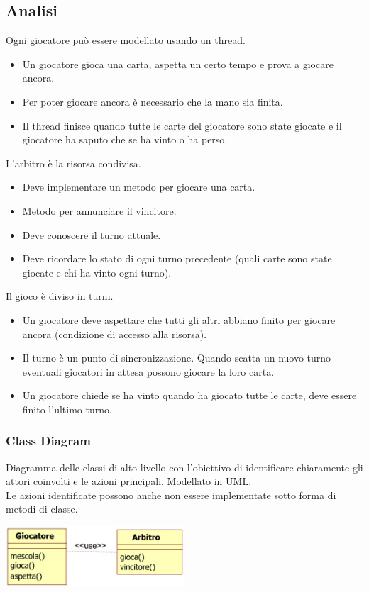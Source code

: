 \subsection{Analisi}
Ogni giocatore può essere modellato usando un thread.
\begin{itemize}
    \item Un giocatore gioca una carta, aspetta un certo tempo e prova a giocare ancora.
    \item Per poter giocare ancora è necessario che la mano sia finita.
    \item Il thread finisce quando tutte le carte del giocatore sono state giocate e il giocatore ha saputo che se ha vinto o ha perso.
\end{itemize}
L'arbitro è la risorsa condivisa.
\begin{itemize}
    \item Deve implementare un metodo per giocare una carta.
    \item Metodo per annunciare il vincitore.
    \item Deve conoscere il turno attuale.
    \item Deve ricordare lo stato di ogni turno precedente (quali carte sono state giocate e chi ha vinto ogni turno).
\end{itemize}
Il gioco è diviso in turni.
\begin{itemize}
    \item Un giocatore deve aspettare che tutti gli altri abbiano finito per giocare ancora (condizione di accesso alla risorsa).
    \item Il turno è un punto di sincronizzazione. Quando scatta un nuovo turno eventuali giocatori in attesa possono giocare la loro carta.
    \item Un giocatore chiede se ha vinto quando ha giocato tutte le carte, deve essere finito l'ultimo turno.
\end{itemize}

\subsubsection{Class Diagram}
Diagramma delle classi di alto livello con l'obiettivo di identificare chiaramente gli attori coinvolti e le azioni principali. Modellato in UML.
\\Le azioni identificate possono anche non essere implementate sotto forma di metodi di classe.
\begin{center}
    \includegraphics[width=0.5\textwidth]{img/es1_cd1.jpg}
\end{center}

